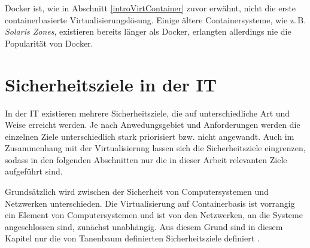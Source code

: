 \documentclass[../main.tex]{subfiles}
\begin{document}

      Docker ist, wie in Abschnitt \ref{introVirtContainer} zuvor erwähnt, nicht die erste containerbasierte Virtualisierungslösung. Einige ältere Containersysteme, wie z.\,B. \emph{Solaris Zones}, existieren bereits länger als Docker, erlangten allerdings nie die Popularität von Docker.


  \section{Sicherheitsziele in der IT}
  \label{introSecGoals}
		In der IT existieren mehrere Sicherheitsziele, die auf unterschiedliche Art und Weise erreicht werden. Je nach Anwedungsgebiet und Anforderungen werden die einzelnen Ziele unterschiedlich stark priorisiert bzw. nicht angewandt. Auch im Zusammenhang mit der Virtualisierung lassen sich die Sicherheitsziele eingrenzen, sodass in den folgenden Abschnitten nur die in dieser Arbeit relevanten Ziele aufgeführt sind.

		Grundsätzlich wird zwischen der Sicherheit von Computersystemen und Netzwerken unterschieden. Die Virtualisierung auf Containerbasis ist vorrangig ein Element von Computersystemen und ist von den Netzwerken, an die Systeme angeschlossen sind, zunächst unabhängig. Aus diesem Grund sind in diesem Kapitel nur die von Tanenbaum definierten Sicherheitsziele definiert \cite[S.712f.]{tanenbaumOS}.



\end{document}
